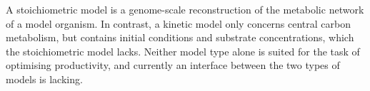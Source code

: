 \documentclass[a4paper, 12pt]{scrartcl}
\begin{document}


A stoichiometric model is a genome-scale reconstruction of the metabolic network of a model organism.  In contrast, a kinetic model only concerns central carbon metabolism, but contains initial conditions and substrate concentrations, which the stoichiometric model lacks. %
Neither model type alone is suited for the task of optimising productivity, and currently an interface between the two types of models is lacking.

\end{document}

